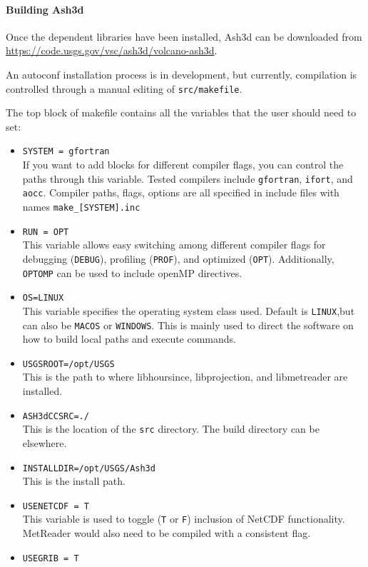 \paragraph{Building Ash3d}
Once the dependent libraries have been installed, Ash3d can be downloaded from
\url{https://code.usgs.gov/vsc/ash3d/volcano-ash3d}.

An autoconf installation process is in development, but currently,
compilation is controlled through a manual editing of 
\texttt{src/makefile}.

The top block of makefile contains all the variables that the user should
need to set:
\begin{itemize}
 \item \texttt{SYSTEM = gfortran}\\
If you want to add blocks for different compiler flags, you can control
the paths through this variable.  Tested compilers include \texttt{gfortran},
\texttt{ifort}, and \texttt{aocc}. Compiler paths, flags, options are all
specified in include files with names \texttt{make\_[SYSTEM].inc}
 \item \texttt{RUN = OPT}\\
This variable allows easy switching among different compiler flags for debugging
(\texttt{DEBUG}),
profiling (\texttt{PROF}), and optimized (\texttt{OPT}).  Additionally, \texttt{OPTOMP}
can be used to include openMP directives.
 \item \texttt{OS=LINUX}\\
This variable specifies the operating system class used.  Default is \texttt{LINUX},but
can also be \texttt{MACOS} or \texttt{WINDOWS}. This is mainly used to direct the
software on how to build local paths and execute commands.
 \item \texttt{USGSROOT=/opt/USGS}\\
This is the path to where libhoursince, libprojection, and libmetreader are installed.
 \item \texttt{ASH3dCCSRC=./}\\
This is the location of the \texttt{src} directory.  The build directory can be
elsewhere.
 \item \texttt{INSTALLDIR=/opt/USGS/Ash3d}\\
This is the install path.
 \item \texttt{USENETCDF = T}\\
This variable is used to toggle (\texttt{T} or \texttt{F}) inclusion of NetCDF
functionality.  MetReader would also need to be compiled with a consistent flag.
 \item \texttt{USEGRIB   = T}\\

\end{itemize}
